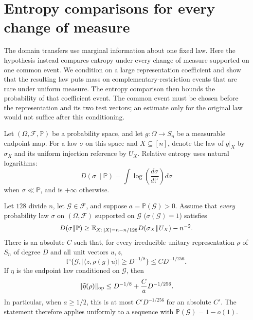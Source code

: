 \section{Entropy comparisons for every change of measure}
\label{l:tilts-section}

The domain transfers use marginal information about one fixed law.
Here the hypothesis instead compares entropy under every change of
measure supported on one common event. We condition on a large
representation coefficient and show that the resulting law puts mass
on complementary-restriction events that are rare under uniform
measure. The entropy comparison then bounds the probability of that
coefficient event. The common event must be chosen before the
representation and its two test vectors; an estimate only for the
original law would not suffice after this conditioning.

Let $(\Omega,\mathcal F,\mathbb P)$ be a probability space, and let
$g:\Omega\to S_n$ be a measurable endpoint map. For a law $\sigma$
on this space and $X\subseteq[n]$, denote the law of $g|_X$ by
$\sigma_X$ and its uniform injection reference by $U_X$.
Relative entropy uses natural logarithms:
\[
 D(\sigma\|\mathbb P)=
 \int\log\!\left(\frac{d\sigma}{d\mathbb P}\right)d\sigma
\]
when $\sigma\ll\mathbb P$, and is $+\infty$ otherwise.

\begin{theorem}
\label{l:tilted-entropy}
Let $128$ divide $n$, let $\mathcal G\in\mathcal F$, and suppose
$a=\mathbb P(\mathcal G)>0$. Assume that \emph{every} probability
law $\sigma$ on $(\Omega,\mathcal F)$ supported on $\mathcal G$
($\sigma(\mathcal G)=1$)
satisfies
\begin{equation}
 D(\sigma\|\mathbb P)\ge
 \mathbb E_{X:\,|X|=n-n/128}D(\sigma_X\|U_X)-n^{-2}.
 \label{l:all-tilts-entropy-input}
\end{equation}
There is an absolute $C$ such that, for every irreducible unitary
representation $\rho$ of $S_n$ of degree $D$ and all unit vectors $u,z$,
\begin{equation}
 \mathbb P\{\mathcal G,
       |\langle z,\rho(g)u\rangle|\ge D^{-1/8}\}
 \le CD^{-1/256}.
 \label{l:tilted-coefficient-tail}
\end{equation}
If $\eta$ is the endpoint law conditioned on $\mathcal G$, then
\begin{equation}
 \|\widehat\eta(\rho)\|_{\mathrm{op}}
 \le D^{-1/8}+\frac C aD^{-1/256}.
 \label{l:tilted-operator-bound}
\end{equation}
In particular, when $a\ge1/2$, this is at most $C'D^{-1/256}$
for an absolute $C'$. The statement therefore applies uniformly to a
sequence with $\mathbb P(\mathcal G)=1-o(1)$.
\end{theorem}


